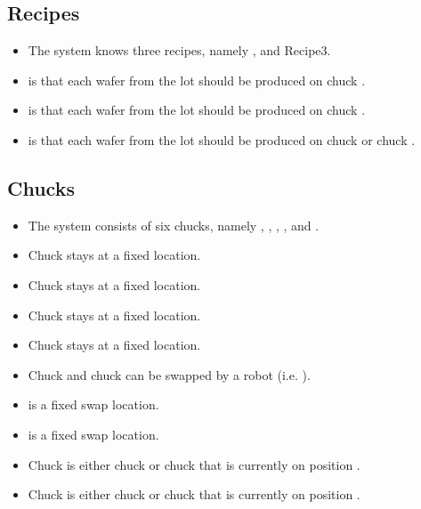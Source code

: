 \subsection{Recipes}
\begin{itemize}
    \item The system knows three recipes, namely \recipeOne, \recipeTwo and Recipe3.
    \item \recipeOne is that each wafer from the lot should be produced on chuck \chuckA.
    \item \recipeTwo is that each wafer from the lot should be produced on chuck \chuckB.
    \item \recipeThree is that each wafer from the lot should be produced on chuck \chuckA or chuck \chuckB.
\end{itemize}

\subsection{Chucks}
\begin{itemize}
    \item The system consists of six chucks, namely \chuckIn, \chuckOut, \chuckEmptyOne, \chuckEmptyTwo, \chuckA and \chuckB.
    \item Chuck \chuckIn stays at a fixed location.
    \item Chuck \chuckOut stays at a fixed location.
    \item Chuck \chuckEmptyOne stays at a fixed location.
    \item Chuck \chuckEmptyTwo stays at a fixed location.
    \item Chuck \chuckA and chuck \chuckB can be swapped by a robot (i.e. \robotSwap).
    \item \chuckMeas is a fixed swap location.
    \item \chuckProj is a fixed swap location.
    \item Chuck \chuckMeas is either chuck \chuckA or chuck \chuckB that is currently on position \chuckMeas.
    \item Chuck \chuckProj is either chuck \chuckA or chuck \chuckB that is currently on position \chuckProj. 
\end{itemize}

